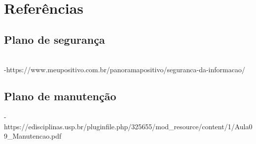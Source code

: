 \chapter{Referências}
\label{referencias}
\section{Plano de segurança}
\\
-https://www.meupositivo.com.br/panoramapositivo/seguranca-da-informacao/ \\

\section{Plano de manutenção}
-https://edisciplinas.usp.br/pluginfile.php/325655/mod_resource/content/1/Aula09_Manutencao.pdf\\